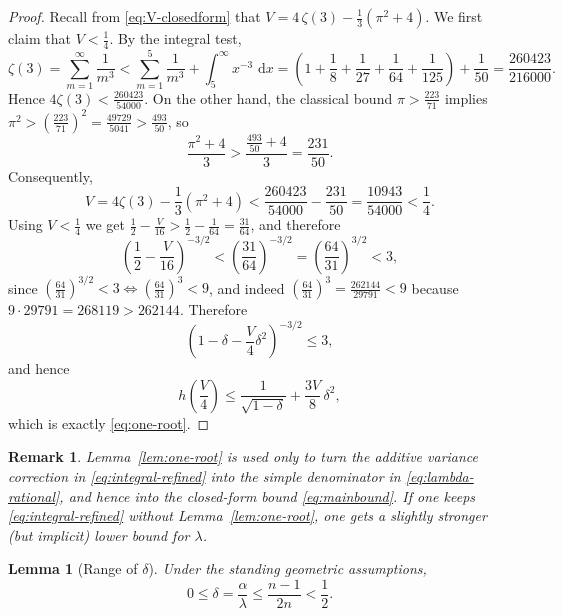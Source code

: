 \documentclass[11pt]{article}
\newtheorem{lemma}[theorem]{Lemma}
\newtheorem{remark}[theorem]{Remark}
\newcommand{\dd}{\,\mathrm{d}}
\begin{document}
\begin{proof}
Recall from \eqref{eq:V-closedform} that $V=4\,\zeta(3)-\frac{1}{3}(\pi^2+4)$.
We first claim that $V<\frac{1}{4}$.
By the integral test,
\begin{equation}
\zeta(3)=\sum_{m=1}^{\infty}\frac{1}{m^3}
<
\sum_{m=1}^{5}\frac{1}{m^3}+\int_{5}^{\infty}x^{-3}\,\dd x
=
\left(1+\frac18+\frac1{27}+\frac1{64}+\frac1{125}\right)+\frac1{50}
=
\frac{260423}{216000}.
\end{equation}
Hence $4\zeta(3)<\frac{260423}{54000}$.
On the other hand, the classical bound $\pi>\frac{223}{71}$ implies
$\pi^2>\left(\frac{223}{71}\right)^2=\frac{49729}{5041}>\frac{493}{50}$, so
\begin{equation}
\frac{\pi^2+4}{3}>\frac{\frac{493}{50}+4}{3}=\frac{231}{50}.
\end{equation}
Consequently,
\begin{equation}
V = 4\zeta(3)-\frac{1}{3}(\pi^2+4)<\frac{260423}{54000}-\frac{231}{50}
=\frac{10943}{54000}<\frac14.
\end{equation}
Using $V<\frac14$ we get $\frac12-\frac{V}{16}>\frac12-\frac{1}{64}=\frac{31}{64}$, and therefore
\begin{equation}
\left(\frac12-\frac{V}{16}\right)^{-3/2}<
\left(\frac{31}{64}\right)^{-3/2}=
\left(\frac{64}{31}\right)^{3/2}<3,
\end{equation}
since
\(
\left(\frac{64}{31}\right)^{3/2}<3
\iff
\left(\frac{64}{31}\right)^3<9
\),
and indeed
\(
\left(\frac{64}{31}\right)^3=\frac{262144}{29791}<9
\)
because $9\cdot 29791=268119>262144$.
Therefore
\begin{equation}
\left(1-\delta-\frac{V}{4}\delta^2\right)^{-3/2}\le 3,
\end{equation}
and hence
\begin{equation}
h\left(\frac{V}{4}\right)
\le
\frac{1}{\sqrt{1-\delta}}+\frac{3V}{8}\,\delta^2,
\end{equation}
which is exactly \eqref{eq:one-root}.
\end{proof}

\begin{remark}
Lemma~\ref{lem:one-root} is used only to turn the additive variance correction in \eqref{eq:integral-refined} into the simple denominator in \eqref{eq:lambda-rational}, and hence into the closed-form bound \eqref{eq:mainbound}. If one keeps \eqref{eq:integral-refined} without Lemma~\ref{lem:one-root}, one gets a slightly stronger (but implicit) lower bound for $\lambda$.
\end{remark}

\begin{lemma}[Range of $\delta$]
\label{lem:delta-range}
Under the standing geometric assumptions,
\begin{equation}
0\le \delta=\frac{\alpha}{\lambda}\le \frac{n-1}{2n}<\frac{1}{2}.
\end{equation}
\end{lemma}
\end{document}
